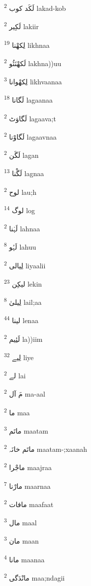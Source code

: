 \documentclass[12pt]{article}
\begin{document}
\begin{RTL}
\begin{multicols}{5}
{\ur لَکَد کوب}   \textsuperscript{2} lakad-kob

{\ur لَکِیر}   \textsuperscript{2} lakiir

{\ur لِکھْنا}   \textsuperscript{19} likhnaa

{\ur لَکھْنَئُو}   \textsuperscript{2} lakhna))uu

{\ur لِکھْوانا}   \textsuperscript{3} likhvaanaa

{\ur لَگانا}   \textsuperscript{18} lagaanaa

{\ur لَگاوَٹ}   \textsuperscript{2} lagaava;t

{\ur لَگاوْنا}   \textsuperscript{2} lagaavnaa

{\ur لَگَن}   \textsuperscript{2} lagan

{\ur لَگْنا}   \textsuperscript{13} lagnaa

{\ur لوح}   \textsuperscript{2} lau;h

{\ur لوگ}   \textsuperscript{14} log

{\ur لَہْنا}   \textsuperscript{2} lahnaa

{\ur لَہُو}   \textsuperscript{8} lahuu

{\ur لِیالی}   \textsuperscript{2} liyaalii

{\ur لیکِن}   \textsuperscript{23} lekin

{\ur لِیلیٰ}   \textsuperscript{8} lail;aa

{\ur لینا}   \textsuperscript{44} lenaa

{\ur لَئِیم}   \textsuperscript{2} la))iim

{\ur لِیے}   \textsuperscript{32} liye

{\ur لے}   \textsuperscript{2} lai

{\ur مَ آل}   \textsuperscript{2} ma-aal

{\ur ما}   \textsuperscript{2} maa

{\ur ماتَم}   \textsuperscript{3} maatam

{\ur ماتَم خانَہ}   \textsuperscript{2} maatam-;xaanah

{\ur ماجْرا}   \textsuperscript{2} maajraa

{\ur مارْنا}   \textsuperscript{7} maarnaa

{\ur مافات}   \textsuperscript{2} maafaat

{\ur مال}   \textsuperscript{3} maal

{\ur مان}   \textsuperscript{3} maan

{\ur مانا}   \textsuperscript{4} maanaa

{\ur مانْدَگی}   \textsuperscript{2} maa;ndagii


\end{multicols}
\end{RTL}
\end{document}
